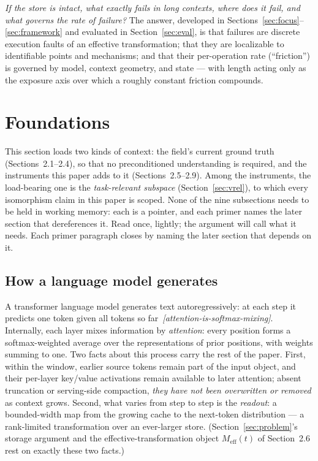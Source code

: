 \documentclass[11pt]{article}
\theoremstyle{remark}
\newif\ifslugs \slugstrue  %
\newcommand{\slug}[1]{\ifslugs\,{\small\textit{[#1]}}\fi}
\newcommand{\Meff}{M_{\mathrm{eff}}}
\begin{document}
\emph{If the store is intact, what exactly fails in long contexts, where does
it fail, and what governs the rate of failure?} The answer, developed in Sections~\ref{sec:focus}--\ref{sec:framework} and
evaluated in Section~\ref{sec:eval}, is that failures are discrete execution faults of
an effective transformation; that they are localizable to identifiable points and
mechanisms; and that their per-operation rate (``friction'') is governed by model,
context geometry, and state --- with length acting only as the exposure axis over
which a roughly constant friction compounds.

\section{Foundations}
\label{sec:foundations}

This section loads two kinds of context: the field's current ground truth
(Sections~2.1--2.4), so that no preconditioned understanding is required, and
the instruments this paper adds to it (Sections~2.5--2.9). Among the
instruments, the load-bearing one is the \emph{task-relevant subspace}
(Section~\ref{sec:vrel}), to which every isomorphism claim in this paper is
scoped. None of the nine subsections needs to be held in working memory:
each is a pointer, and each primer names the later section that dereferences
it. Read once, lightly; the argument will call what it needs. Each primer
paragraph closes by naming the later section that depends on it.

\subsection{How a language model generates}

A transformer language model generates text autoregressively: at each step it
predicts one token given all tokens so far \citep{vaswani2017attention}\slug{attention-is-softmax-mixing}.
Internally, each layer mixes information by \emph{attention}: every position
forms a softmax-weighted average over the representations of prior positions,
with weights summing to one. Two facts about this process carry the rest of
the paper. First, within the window, earlier source tokens remain part of the input
object, and their per-layer key/value activations remain available to later
attention; absent truncation or serving-side compaction, \emph{they have not
been overwritten or removed} as context grows. Second, what
varies from step to step is the \emph{readout}: a bounded-width map from the
growing cache to the next-token distribution --- a rank-limited transformation
over an ever-larger store. (Section~\ref{sec:problem}'s storage argument and
the effective-transformation object $\Meff(t)$ of Section~2.6 rest on exactly
these two facts.)
\end{document}
